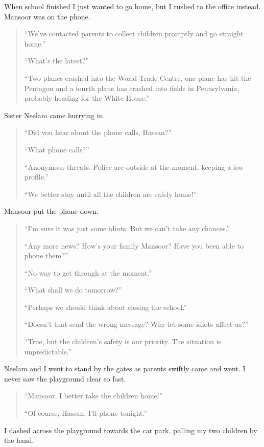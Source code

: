\documentclass[12pt]{memoir}
\newcommand{\cor}[2]{#2} %
\begin{document}
When school finished I just wanted to go home,
but I rushed to the office instead.
Mansoor was on the phone.

\begin{quote}
“We’ve contacted parents to collect children promptly and go straight home.”

“What’s the latest?”

“Two planes crashed into the World Trade Centre,
one plane has hit the Pentagon and a fourth plane has crashed
into fields in Pennsylvania, probably heading for the White House.”
\end{quote}

Sister Neelam came hurrying in.

\begin{quote}
“Did you hear about the phone calls\cor{}{,} Hassan?”

“What phone calls?”

“Anonymous threats.
Police are outside at the moment, keeping a low profile.”

“We better stay until all the children are safely home!”
\end{quote}

Mansoor put the phone down.

\begin{quote}
“I’m sure it was just some idiots.
But we can’t take any chances.”

“Any more news? How’s your family Mansoor? Have you been able to phone them?”

“No way to get through at the moment.”

“What shall we do tomorrow?”

“Perhaps we should think about closing the school.”

“Doesn’t that send the wrong message? Why let some idiots affect us?”

“True, but the children’s safety is our priority.
The situation is unpredictable.”
\end{quote}

Neelam and I went to stand by the gates as parents swiftly came and went.
I never saw the playground clear so fast.

\begin{quote}
“Mansoor, I better take the children home!”

“Of course, Hassan.
I’ll phone tonight.”
\end{quote}

I dashed across the playground towards the car park,
pulling my two children by the hand.
\end{document}
